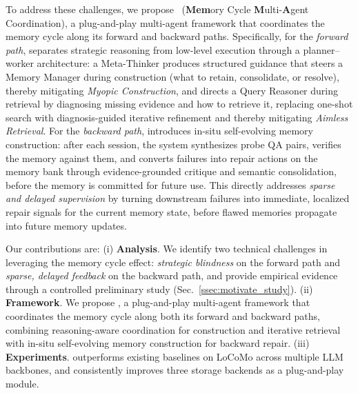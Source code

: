 To address these challenges, we propose \method\ (\textbf{Mem}ory Cycle 
\textbf{M}ulti-\textbf{A}gent Coordination), a plug-and-play multi-agent 
framework that coordinates the memory cycle along its forward and backward paths.
Specifically, for the \emph{forward path}, \method separates strategic reasoning from low-level execution through a planner--worker architecture: a Meta-Thinker produces structured guidance that steers a Memory Manager during construction (what to retain, consolidate, or resolve), {thereby mitigating \emph{Myopic Construction}}, and directs a Query Reasoner during retrieval {by diagnosing missing evidence and how to retrieve it, replacing one-shot search with diagnosis-guided iterative refinement and thereby mitigating \emph{Aimless Retrieval}}. 
For the \emph{backward path}, \method introduces {in-situ self-evolving memory construction}: after each session, the system synthesizes probe QA pairs, verifies the memory against them, and converts failures into repair actions on the memory bank through evidence-grounded critique and semantic consolidation, 
before the memory is committed for future use. 
{This directly addresses \emph{sparse and delayed supervision} by turning 
downstream failures into immediate, localized repair signals for the current 
memory state, before flawed memories propagate into future memory updates.}


Our contributions are:
(i) \textbf{Analysis}. We identify two technical challenges in leveraging the memory cycle effect: \emph{strategic blindness} on the forward path and \emph{sparse, delayed feedback} on the backward path, and provide empirical evidence through a controlled preliminary study (Sec.~\ref{ssec:motivate_study}).
(ii) \textbf{Framework}. We propose \method, a plug-and-play multi-agent framework that coordinates the memory cycle along both its forward and backward paths, combining reasoning-aware coordination for construction and iterative retrieval with in-situ self-evolving memory construction for backward repair.
(iii) \textbf{Experiments}. \method outperforms existing baselines on LoCoMo across multiple LLM backbones, and consistently improves three storage backends as a plug-and-play module.


